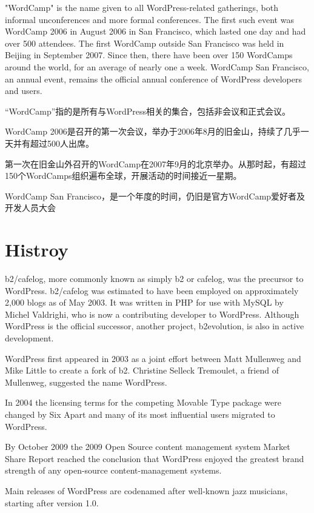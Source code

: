 "WordCamp" is the name given to all WordPress-related gatherings, both informal unconferences and more formal conferences. The first such event was WordCamp 2006 in August 2006 in San Francisco, which lasted one day and had over 500 attendees. The first WordCamp outside San Francisco was held in Beijing in September 2007. Since then, there have been over 150 WordCamps around the world, for an average of nearly one a week. WordCamp San Francisco, an annual event, remains the official annual conference of WordPress developers and users.



“WordCamp”指的是所有与WordPress相关的集合，包括非会议和正式会议。

WordCamp 2006是召开的第一次会议，举办于2006年8月的旧金山，持续了几乎一天并有超过500人出席。

第一次在旧金山外召开的WordCamp在2007年9月的北京举办。从那时起，有超过150个WordCamps组织遍布全球，开展活动的时间接近一星期。

WordCamp San Francisco，是一个年度的时间，仍旧是官方WordCamp爱好者及开发人员大会



\chapter{Histroy}

b2/cafelog, more commonly known as simply b2 or cafelog, was the precursor to WordPress. b2/cafelog was estimated to have been employed on approximately 2,000 blogs as of May 2003. It was written in PHP for use with MySQL by Michel Valdrighi, who is now a contributing developer to WordPress. Although WordPress is the official successor, another project, b2evolution, is also in active development.

WordPress first appeared in 2003 as a joint effort between Matt Mullenweg and Mike Little to create a fork of b2. Christine Selleck Tremoulet, a friend of Mullenweg, suggested the name WordPress.

In 2004 the licensing terms for the competing Movable Type package were changed by Six Apart and many of its most influential users migrated to WordPress.

By October 2009 the 2009 Open Source content management system Market Share Report reached the conclusion that WordPress enjoyed the greatest brand strength of any open-source content-management systems.

Main releases of WordPress are codenamed after well-known jazz musicians, starting after version 1.0.


